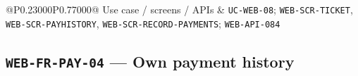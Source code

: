 \begin{longtable}{@{}P{0.23000\SRSWidth}P{0.77000\SRSWidth}@{}}
Use case /\allowbreak{} screens /\allowbreak{} APIs & \texttt{UC-\allowbreak{}WEB-\allowbreak{}08}; \texttt{WEB-\allowbreak{}SCR-\allowbreak{}TICKET}, \texttt{WEB-\allowbreak{}SCR-\allowbreak{}PAYHISTO\allowbreak{}RY}, \texttt{WEB-\allowbreak{}SCR-\allowbreak{}RECORD-\allowbreak{}PAYMENTS\allowbreak{}}; \texttt{WEB-\allowbreak{}API-\allowbreak{}084} \\[3pt]
\end{longtable}
\endgroup

\subsection{\texttt{WEB-\allowbreak{}FR-\allowbreak{}PAY-\allowbreak{}04} — Own payment history}
\begingroup
\fontsize{9.5}{12}\selectfont
\setlength{\SRSWidth}{\dimexpr\linewidth-2\tabcolsep\relax}

